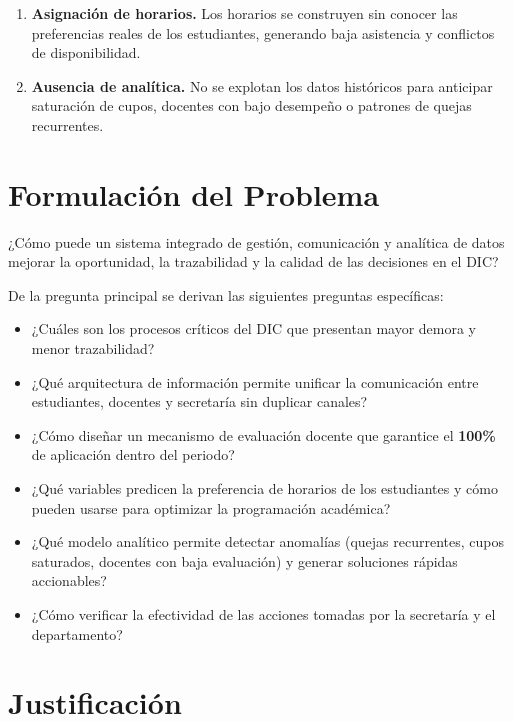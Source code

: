 \begin{enumerate}[leftmargin=1.4cm, itemsep=5pt]
  \item \textbf{Asignación de horarios.} Los horarios se construyen sin conocer
        las preferencias reales de los estudiantes, generando baja asistencia y
        conflictos de disponibilidad.

  \item \textbf{Ausencia de analítica.} No se explotan los datos históricos para
        anticipar saturación de cupos, docentes con bajo desempeño o patrones de
        quejas recurrentes.
\end{enumerate}

\section{Formulación del Problema}

\begin{cajaNota}
¿Cómo puede un sistema integrado de gestión, comunicación y analítica de datos
mejorar la oportunidad, la trazabilidad y la calidad de las decisiones en el
\ac{DIC}?
\end{cajaNota}

De la pregunta principal se derivan las siguientes preguntas específicas:

\begin{itemize}[leftmargin=1.4cm, itemsep=3pt]
  \item ¿Cuáles son los procesos críticos del \ac{DIC} que presentan mayor
        demora y menor trazabilidad?
  \item ¿Qué arquitectura de información permite unificar la comunicación entre
        estudiantes, docentes y secretaría sin duplicar canales?
  \item ¿Cómo diseñar un mecanismo de evaluación docente que garantice el
        \textbf{100\%} de aplicación dentro del periodo?
  \item ¿Qué variables predicen la preferencia de horarios de los estudiantes y
        cómo pueden usarse para optimizar la programación académica?
  \item ¿Qué modelo analítico permite detectar anomalías (quejas recurrentes,
        cupos saturados, docentes con baja evaluación) y generar soluciones
        rápidas accionables?
  \item ¿Cómo verificar la efectividad de las acciones tomadas por la secretaría
        y el departamento?
\end{itemize}

\section{Justificación}

